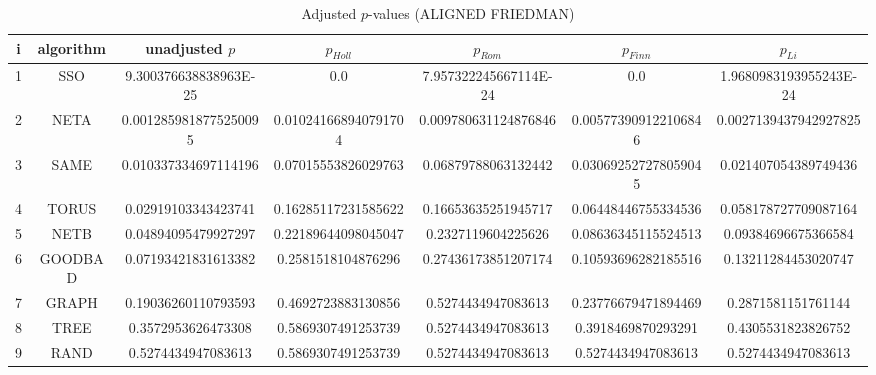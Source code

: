 \documentclass[a4paper,10pt]{article}
\begin{document}
\begin{landscape}
\begin{table}[!htp]
\centering\scriptsize
\caption{Adjusted $p$-values (ALIGNED FRIEDMAN)}
\begin{tabular}{ccccccc}
i&algorithm&unadjusted $p$&$p_{Holl}$&$p_{Rom}$&$p_{Finn}$&$p_{Li}$\\
\hline
1& SSO&9.300376638838963E-25&0.0&7.957322245667114E-24&0.0&1.9680983193955243E-24\\
2& NETA&0.0012859818775250095&0.010241668940791704&0.009780631124876846&0.005773909122106846&0.0027139437942927825\\
3& SAME&0.010337334697114196&0.07015553826029763&0.06879788063132442&0.030692527278059045&0.021407054389749436\\
4& TORUS&0.02919103343423741&0.16285117231585622&0.16653635251945717&0.06448446755334536&0.058178727709087164\\
5& NETB&0.04894095479927297&0.22189644098045047&0.2327119604225626&0.08636345115524513&0.09384696675366584\\
6& GOODBAD&0.07193421831613382&0.2581518104876296&0.27436173851207174&0.10593696282185516&0.13211284453020747\\
7& GRAPH&0.19036260110793593&0.4692723883130856&0.5274434947083613&0.23776679471894469&0.2871581151761144\\
8& TREE&0.3572953626473308&0.5869307491253739&0.5274434947083613&0.3918469870293291&0.4305531823826752\\
9& RAND&0.5274434947083613&0.5869307491253739&0.5274434947083613&0.5274434947083613&0.5274434947083613\\
\hline
\end{tabular}
\end{table}


\newpage


\end{landscape}
\end{document}
